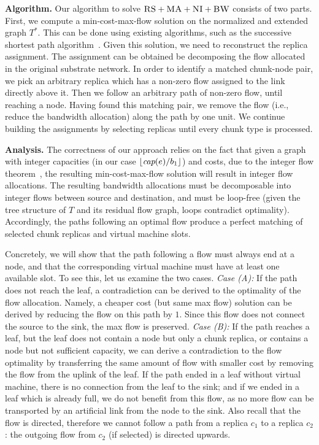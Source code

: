 \documentclass[9pt,twocolumn]{scrartcl}
\newcommand{\achunk}{\ensuremath{c}}
\newcommand{\capacity}{\emph{cap}}
\newcommand{\CC}{\textsc{NI}}
\newcommand{\RS}{\textsc{RS}}
\newcommand{\BW}{\textsc{BW}}
\newcommand{\MA}{\textsc{MA}}
\newcommand{\Tree}{\ensuremath{T}}
\newcommand{\CostTrans}{\ensuremath{b_1}}
\begin{document}
\textbf{Algorithm.}
Our algorithm to solve $\RS+\MA+\CC+\BW$ consists of two parts. 
First, we compute a min-cost-max-flow solution on the normalized and extended graph $\Tree^*$. 
This can be done using existing algorithms, such as the successive shortest path algorithm~\cite{successive_shortest_path_complexity}.
Given this solution, we need to reconstruct the replica assignment. 
The assignment can be obtained be decomposing the flow allocated in the
original substrate network. In order to identify a matched chunk-node pair, we 
pick an arbitrary replica which has a non-zero flow assigned to the link directly above it. 
Then we follow an arbitrary path of non-zero flow, until reaching a node.
Having found this matching pair, we remove the flow (i.e., reduce the bandwidth allocation)
along the path by one unit. 
We continue building the assignments by selecting replicas until every chunk type is processed.

\textbf{Analysis.}
The correctness of our approach relies on the fact that
given a graph with integer capacities (in our case $\lfloor\capacity(e)/\CostTrans\rfloor$)
and costs, due to the integer flow theorem~\cite{successive_shortest_path_complexity},
the resulting min-cost-max-flow solution will result in integer flow allocations. The resulting
bandwidth allocations must be decomposable into integer flows between source and destination,
and must be loop-free (given the tree structure of $\Tree$ and its residual flow graph, loops contradict optimality). 
Accordingly, the paths following an optimal flow produce a perfect matching of selected chunk replicas and virtual machine slots.

Concretely, we will show that the path following a flow must always end at a node, and that the
corresponding virtual machine must have at least one available slot.
To see this, let us examine the two cases.
\emph{Case (A):} If the path does not reach the leaf, a contradiction can be derived to the optimality of
the flow allocation. Namely, a cheaper cost (but same max flow) solution can be derived by reducing the flow on this path by $1$.
Since this flow does not connect the source to the sink, the max flow is preserved. 
\emph{Case (B):} If the 
path reaches a leaf, but the leaf does not contain a node but only a chunk replica, or
 contains a node but not sufficient capacity, 
 we can derive a contradiction to the flow optimality by transferring the same amount of flow with smaller cost by removing 
 the flow from the uplink of the leaf. 
 If the path ended in a leaf without virtual machine, there is no connection from the leaf to the sink; 
 and if we ended in a leaf which is already full, we do not benefit from this flow, 
 as no more flow can be transported by an artificial link from the node to the 
 sink. 
 Also recall that the flow is directed, therefore we cannot follow a path 
 from a replica $\achunk_1$ to a replica $\achunk_2$: the 
 outgoing flow from $\achunk_2$ (if selected) is directed upwards.
\end{document}
